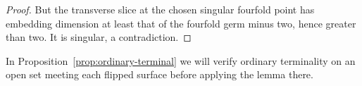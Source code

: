 \begin{proof}
But the transverse slice at the chosen singular fourfold
point has embedding dimension at least that of the fourfold
germ minus two, hence greater than two. It is singular, a
contradiction.
\end{proof}

In Proposition~\ref{prop:ordinary-terminal} we will verify ordinary
terminality on an open set meeting each flipped surface before
applying the lemma there.
